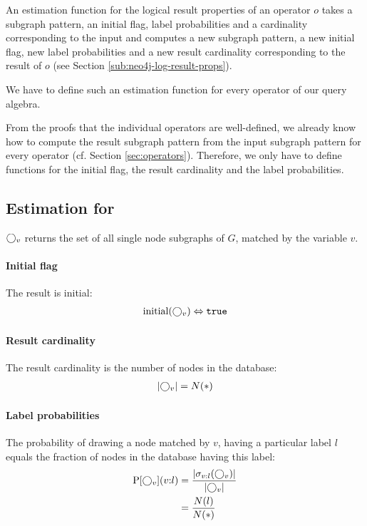 An estimation function for the logical result properties of an operator $o$
takes a subgraph pattern, an initial flag, label probabilities and a cardinality
corresponding to the input and computes a new subgraph pattern, a new initial
flag, new label probabilities and a new result cardinality corresponding to the
result of $o$ (see Section \ref{sub:neo4j-log-result-props}).

We have to define such an estimation function for every operator of our
query algebra.

From the proofs that the individual operators are well-defined, we already
know how to compute the result subgraph pattern from the input subgraph
pattern for every operator (cf. Section \ref{sec:operators}).
Therefore, we only have to define functions for the initial flag, the result
cardinality and the label probabilities.

\subsection{Estimation for }
$\bigcirc_{v}$ returns the set of all single node subgraphs of $G$,
matched by the variable $v$.

\paragraph{Initial flag}

The result is initial:
\begin{align}
  \textnormal{initial}(\bigcirc_{v}) \Leftrightarrow \texttt{true}
\end{align}

\paragraph{Result cardinality}

The result cardinality is the number of nodes in the database:
\begin{align}
  {\left \vert \bigcirc_{v} \right \vert} = N(*)
\end{align}

\paragraph{Label probabilities}

The probability of drawing a node matched by $v$, having a particular label $l$
equals the fraction of nodes in the database having this label: 
\begin{align}
\begin{split}
  \operatorname{P}[\bigcirc_{v}](v{:}l) &= \frac{{\left \vert \sigma_{v:l}(\bigcirc_{v}) \right \vert}}
                                     {{\left \vert \bigcirc_{v} \right \vert}} \\
                             &= \frac{N(l)}{N(*)}
\end{split}
\end{align}


